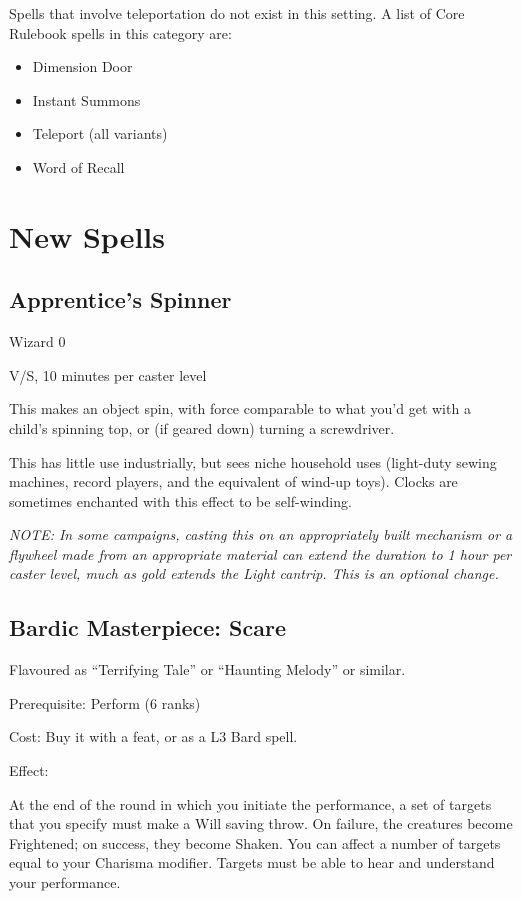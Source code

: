 Spells that involve teleportation do not exist in this setting. A list of
Core Rulebook spells in this category are:

\begin{itemize}
\item Dimension Door
\item Instant Summons
\item Teleport (all variants)
\item Word of Recall
\end{itemize}
%

%
%
\section{New Spells}


%
\subsection{Apprentice's Spinner}

Wizard 0

V/S, 10 minutes per caster level

This makes an object spin, with force comparable to what you'd get with a
child's spinning top, or (if geared down) turning a screwdriver.

This has little use industrially, but sees niche household uses (light-duty
sewing machines, record players, and the equivalent of wind-up toys). Clocks
are sometimes enchanted with this effect to be self-winding.

\textit{NOTE: In some campaigns, casting this on an appropriately built
mechanism or a flywheel made from an appropriate material can extend the
duration to 1 hour per caster level, much as gold extends the Light cantrip.
This is an optional change.}
%

%
\subsection{Bardic Masterpiece: Scare}

Flavoured as ``Terrifying Tale'' or ``Haunting Melody'' or similar.

Prerequisite: Perform (6 ranks)

Cost: Buy it with a feat, or as a L3 Bard spell.

Effect:

At the end of the round in which you initiate the performance, a set of
targets that you specify must make a Will saving throw. On failure, the
creatures become Frightened; on success, they become Shaken. You can affect
a number of targets equal to your Charisma modifier. Targets must be able
to hear and understand your performance.

